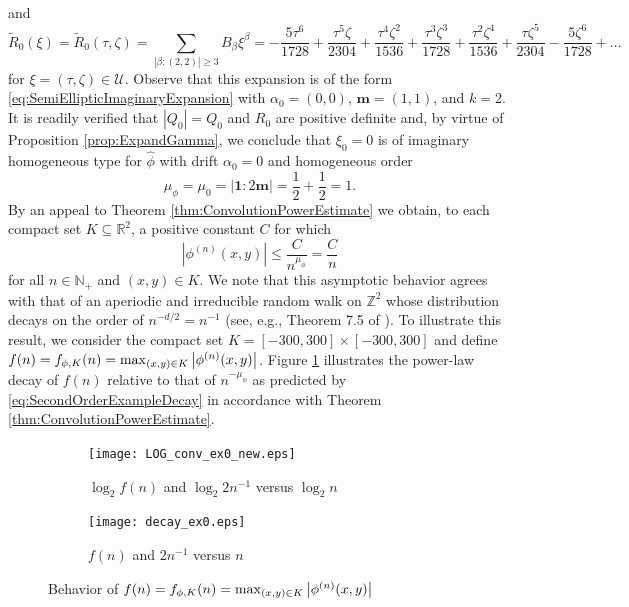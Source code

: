 \documentclass[11pt]{article}
\newenvironment{example}
  {\pushQED{\qed}\renewcommand{\qedsymbol}{$\triangle$}\examplex}
  {\popQED\endexamplex}
\theoremstyle{remark}
\newcommand{\f}[2]{\frac{#1}{#2}}
\begin{document}
\begin{example}
\begin{equation*}
\end{equation*}
and
\begin{equation*}
\widetilde{R}_{0}(\xi)=\widetilde{R}_0(\tau,\zeta)=\sum_{|\beta:(2,2)|\geq 3}B_\beta \xi^\beta =
-\f{5\tau^6}{1728} + \f{\tau^5\zeta}{2304} + \frac{\tau^4\zeta^2}{1536} +   \frac{\tau^3\zeta^3}{1728} +   \frac{\tau^2\zeta^4}{1536}  + \f{\tau\zeta^5}{2304} - \f{5\zeta^6}{1728} + \dots
\end{equation*}
for $\xi=(\tau,\zeta)\in\mathcal{U}$. Observe that this expansion is of the form \eqref{eq:SemiEllipticImaginaryExpansion} with $\alpha_0=(0,0)$, $\mathbf{m}=(1,1)$, and $k=2$. It is readily verified that $|Q_0|=Q_0$ and $R_0$ are positive definite and, by virtue of Proposition \ref{prop:ExpandGamma}, we conclude that $\xi_0=0$ is of imaginary homogeneous type for $\widehat\phi$ with drift $\alpha_0=0$ and homogeneous order
\begin{equation*}
    \mu_{\phi}=\mu_0=|\mathbf{1}:2\mathbf{m}|=\frac{1}{2}+\frac{1}{2}=1.
\end{equation*}
By an appeal to Theorem \ref{thm:ConvolutionPowerEstimate} we obtain, to each compact set $K\subseteq\mathbb{R}^2$, a positive constant $C$ for which
\begin{equation}\label{eq:SecondOrderExampleDecay}
    |\phi^{(n)}(x,y)|\leq \frac{C}{n^{\mu_\phi}}=\frac{C}{n}
\end{equation}
for all $n\in\mathbb{N}_+$ and $(x,y)\in K$. We note that this asymptotic behavior agrees with that of an aperiodic and irreducible random walk on $\mathbb{Z}^2$ whose distribution decays on the order of $n^{-d/2}=n^{-1}$ (see, e.g., Theorem 7.5 of \cite{randles_convolution_2017}). To illustrate this result, we consider the compact set $K = [-300, 300] \times [-300, 300]$ and define $f(n)=f_{\phi,K}(n)=\max_{(x,y)\in K}\abs{\phi^{(n)}(x,y)}$. Figure \ref{fig:Conv_Pwr_0} illustrates the power-law decay of $f(n)$ relative to that of $n^{-\mu_\phi}$ as predicted by \eqref{eq:SecondOrderExampleDecay} in accordance with Theorem \ref{thm:ConvolutionPowerEstimate}.\\


\begin{figure}[!htb]
    \begin{subfigure}{0.49\textwidth}
    \centering
    \texttt{[image: LOG\_conv\_ex0\_new.eps]}
    \caption{$\log_2 f(n)$ and $\log_2 2n^{-1}$ versus $\log_2 n$}
    \end{subfigure}
    \begin{subfigure}{0.49\textwidth}
    \centering
    \texttt{[image: decay\_ex0.eps]}
    \caption{$f(n)$ and $2n^{-1}$ versus $n$}
    \end{subfigure}
    \caption{Behavior of $f(n)=f_{\phi,K}(n)=\max_{(x,y)\in K}\abs{\phi^{(n)}(x,y)}$}
    \label{fig:Conv_Pwr_0}
\end{figure}





\end{example}
\end{document}
